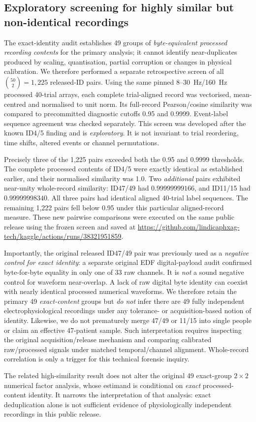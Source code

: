 \subsection{Exploratory screening for highly similar but non-identical recordings}
\label{sec:p2-whole-record-near-overlap}
The exact-identity audit establishes 49 groups of
\emph{byte-equivalent processed recording contents}
for the primary analysis; it cannot identify
near-duplicates produced by scaling, quantisation,
partial corruption or changes in physical calibration.
We therefore performed a separate retrospective
screen of all $\binom{50}{2}=1,225$ released-ID pairs.
Using the same pinned 8--30~Hz/160~Hz processed
40-trial arrays, each complete trial-aligned
record was vectorised, mean-centred and normalised
to unit norm. Its full-record Pearson/cosine
similarity was compared to precommitted
diagnostic cutoffs 0.95 and 0.9999.
Event-label sequence agreement was checked
separately. This screen was developed after
the known ID4/5 finding and is \emph{exploratory}.
It is not invariant to trial reordering, time
shifts, altered events or channel permutations.

Precisely three of the 1,225 pairs exceeded
both the 0.95 and 0.9999 thresholds.
The complete processed contents of ID4/5
were exactly identical as established earlier,
and their normalised similarity was 1.0.
Two \emph{additional} pairs exhibited
near-unity whole-record similarity:
ID47/49 had $0.99999999166$, and ID11/15
had $0.99999998340$. All three pairs
had identical aligned 40-trial label sequences.
The remaining 1,222 pairs fell below 0.95
under this particular aligned-record measure.
These new pairwise comparisons were
executed on the same public release using
the frozen screen and saved at
\url{https://github.com/lindicaphxag-tech/kaggle/actions/runs/38321951859}.

Importantly, the original released ID47/49
pair was previously used as a
\emph{negative control for exact identity}:
a separate original EDF digital-payload audit
confirmed byte-for-byte equality in only one of
33 raw channels. It is \emph{not} a sound
negative control for waveform near-overlap.
A lack of raw digital byte identity can coexist
with nearly identical processed numerical
waveforms. We therefore retain the primary
49 \emph{exact-content} groups but
\emph{do not} infer there are 49 fully
independent electrophysiological recordings
under any tolerance- or acquisition-based
notion of identity. Likewise, we do not
prematurely merge 47/49 or 11/15 into
single people or claim an effective 47-patient
sample. Such interpretation requires inspecting
the original acquisition/release mechanism
and comparing calibrated raw/processed signals
under matched temporal/channel alignment.
Whole-record correlation is only a trigger
for this technical forensic inquiry.

The related high-similarity result does not
alter the original 49 exact-group
$2\times2$ numerical factor analysis,
whose estimand is conditional on \emph{exact}
processed-content identity. It narrows the
interpretation of that analysis: exact
deduplication alone is not sufficient
evidence of physiologically independent
recordings in this public release.
